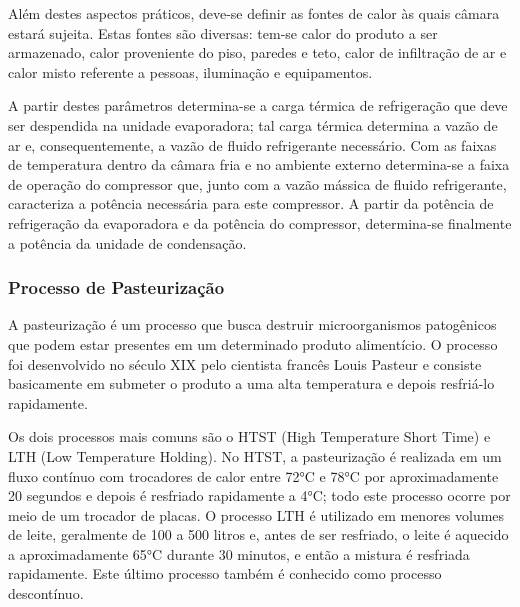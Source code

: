 \documentclass[10pt,a4paper]{article}
\begin{document}
Além destes aspectos práticos, deve-se definir as fontes de calor às quais câmara estará sujeita. Estas fontes são diversas: tem-se calor do produto a ser armazenado, calor proveniente do piso, paredes e teto, calor de infiltração de ar e calor misto referente a pessoas, iluminação e equipamentos.


A partir destes parâmetros determina-se a carga térmica de refrigeração que deve ser despendida na unidade evaporadora; tal carga térmica determina a vazão de ar e, consequentemente, a vazão de fluido refrigerante necessário. Com as faixas de temperatura dentro da câmara fria e no ambiente externo determina-se a faixa de operação do compressor que, junto com a vazão mássica de fluido refrigerante, caracteriza a potência necessária para este compressor. A partir da potência de refrigeração da evaporadora e da potência do compressor, determina-se finalmente a potência da unidade de condensação.

\subsubsection{{ Processo de Pasteurização}}

A pasteurização é um processo que busca destruir microorganismos patogênicos que podem estar presentes em um determinado produto alimentício. O processo foi desenvolvido no século XIX pelo cientista francês Louis Pasteur e consiste basicamente em submeter o produto a uma alta temperatura e depois resfriá-lo rapidamente. 

Os dois processos mais comuns são o HTST (High Temperature Short Time) e LTH (Low Temperature Holding). No HTST, a pasteurização é realizada em um fluxo contínuo com trocadores de calor entre 72°C e 78°C por aproximadamente 20 segundos e depois é resfriado rapidamente a 4°C; todo este processo ocorre por meio de um trocador de placas. O processo LTH é utilizado em menores volumes de leite, geralmente de 100 a 500 litros e, antes de ser resfriado, o leite é aquecido a aproximadamente 65°C durante 30 minutos, e então a mistura é resfriada rapidamente. Este último processo também é conhecido como processo descontínuo. 
\end{document}
